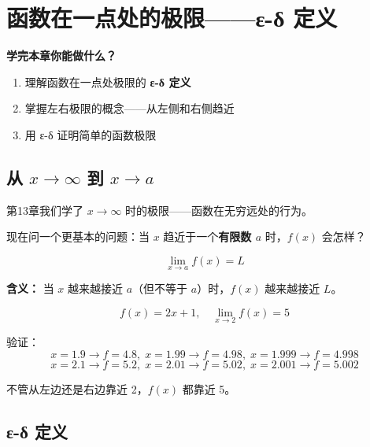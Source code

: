 
\chapter{函数在一点处的极限——ε-δ 定义}

\begin{applicationbox}
\textbf{学完本章你能做什么？}
\begin{enumerate}
  \item 理解函数在一点处极限的 \textbf{ε-δ 定义}
  \item 掌握左右极限的概念——从左侧和右侧趋近
  \item 用 ε-δ 证明简单的函数极限
\end{enumerate}
\end{applicationbox}


\section{从 \(x \to \infty\) 到 \(x \to a\)}

第13章我们学了 \(x \to \infty\) 时的极限——函数在无穷远处的行为。

现在问一个更基本的问题：当 \(x\) 趋近于一个\textbf{有限数 \(a\)} 时，\(f(x)\) 会怎样？

\[
\lim_{x \to a} f(x) = L
\]

\textbf{含义：} 当 \(x\) 越来越接近 \(a\)（但不等于 \(a\)）时，\(f(x)\) 越来越接近 \(L\)。

\begin{examplebox}[1——直观例子]
\[
f(x) = 2x + 1,\quad \lim_{x \to 2} f(x) = 5
\]

验证：
\[
x=1.9 \to f=4.8,\; x=1.99 \to f=4.98,\; x=1.999 \to f=4.998
\]
\[
x=2.1 \to f=5.2,\; x=2.01 \to f=5.02,\; x=2.001 \to f=5.002
\]

不管从左边还是右边靠近 2，\(f(x)\) 都靠近 5。
\end{examplebox}


\section{ε-δ 定义}

